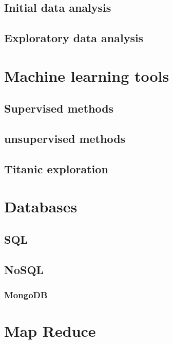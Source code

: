 \documentclass[10pt]{PhDthesisPSnPDF}%
\begin{document}
\section{Initial data analysis}\label{numBasics}


\section{Exploratory data analysis}\label{NumDesign}



\chapter{Machine learning tools}\label{MLearn}

\section{Supervised methods}
\section{unsupervised methods}

\section{Titanic exploration}


\chapter{Databases}\label{databases}
\section{SQL}
\section{NoSQL}
\subsection{MongoDB}
\chapter{Map Reduce}\label{mapR}
\end{document}
